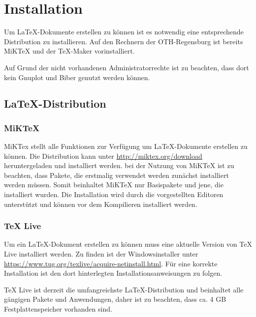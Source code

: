 \documentclass[13pt,a4paper, listof=entryprefix, bibliography=totocnumbered,toc=listofnumbered,lof=listofnumbered]{scrartcl}
\begin{document}

\section{Installation}
\label{ch:installation}
Um \LaTeX-Dokumente erstellen zu können ist es notwendig eine entsprechende Distribution zu installieren. Auf den Rechnern der OTH-Regensburg ist bereits MiKTeX und der TeX-Maker vorinstalliert.

Auf Grund der nicht vorhandenen Administratorrechte ist zu beachten, dass dort kein Gnuplot und Biber genutzt werden können.

\subsection{\LaTeX-Distribution}
\subsubsection{MiKTeX}
MiKTex stellt alle Funktionen zur Verfügung um \LaTeX-Dokumente erstellen zu können. Die Distribution kann unter \url{http://miktex.org/download} heruntergeladen und installiert werden. bei der Nutzung von MiKTeX ist zu beachten, dass Pakete, die erstmalig verwendet werden zunächst installiert werden müssen. Somit beinhaltet MiKTeX nur Basispakete und jene, die installiert wurden. Die Installation wird durch die vorgestellten Editoren unterstützt und können vor dem Kompilieren installiert werden.

\subsubsection{TeX Live}
\label{ch:texlive}
Um ein \LaTeX-Dokument erstellen zu können muss eine aktuelle Version von TeX Live installiert werden. Zu finden ist der Windowsinstaller unter \url{https://www.tug.org/texlive/acquire-netinstall.html}. Für eine korrekte Installation ist den dort hinterlegten Installationsanweisungen zu folgen.

TeX Live ist derzeit die umfangreichste \LaTeX-Distribution und beinhaltet alle gängigen Pakete und Anwendungen, daher ist zu beachten, dass ca. 4 GB Festplattenspeicher vorhanden sind.
\end{document}
